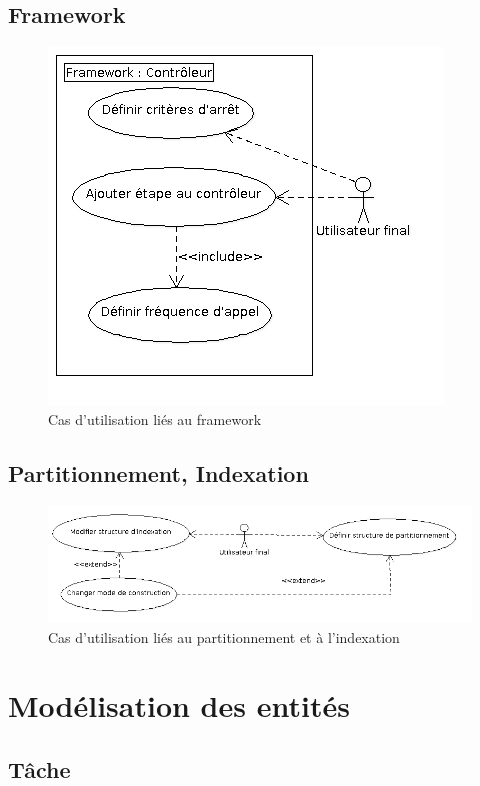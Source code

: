 \subsection{Framework}
\begin{figure}[!h]\centering
   \includegraphics[scale=0.6]{images/uc_framework.png}
   \caption{\label{uc_main} Cas d'utilisation liés au framework}
\end{figure}
\subsection{Partitionnement, Indexation}
\begin{figure}[!h]\centering
   \includegraphics[scale=0.6]{images/uc_index_part.png}
   \caption{\label{uc_main} Cas d'utilisation liés au partitionnement et à l'indexation}
\end{figure}
%
\newpage
\section{Modélisation des entités}

\subsection{Tâche}

